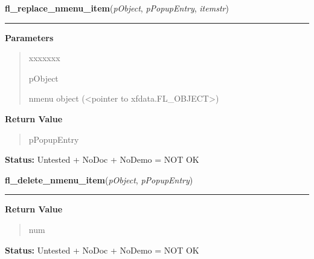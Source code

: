 \hspace{.8\funcindent}\begin{boxedminipage}{\funcwidth}

    \raggedright \textbf{fl\_replace\_nmenu\_item}(\textit{pObject}, \textit{pPopupEntry}, \textit{itemstr})

    \vspace{-1.5ex}

    \rule{\textwidth}{0.5\fboxrule}
\setlength{\parskip}{2ex}
\setlength{\parskip}{1ex}
      \textbf{Parameters}
      \vspace{-1ex}

      \begin{quote}
        \begin{Ventry}{xxxxxxx}

          \item[pObject]

          nmenu object ({\textless}pointer to 
          xfdata.FL\_OBJECT{\textgreater})

        \end{Ventry}

      \end{quote}

      \textbf{Return Value}
    \vspace{-1ex}

      \begin{quote}
      pPopupEntry

      \end{quote}

\textbf{Status:} Untested + NoDoc + NoDemo = NOT OK



    \end{boxedminipage}

    \label{xformslib:library:fl_delete_nmenu_item}

    \vspace{0.5ex}

\hspace{.8\funcindent}\begin{boxedminipage}{\funcwidth}

    \raggedright \textbf{fl\_delete\_nmenu\_item}(\textit{pObject}, \textit{pPopupEntry})

    \vspace{-1.5ex}

    \rule{\textwidth}{0.5\fboxrule}
\setlength{\parskip}{2ex}
\setlength{\parskip}{1ex}
      \textbf{Return Value}
    \vspace{-1ex}

      \begin{quote}
      num

      \end{quote}

\textbf{Status:} Untested + NoDoc + NoDemo = NOT OK



    \end{boxedminipage}

